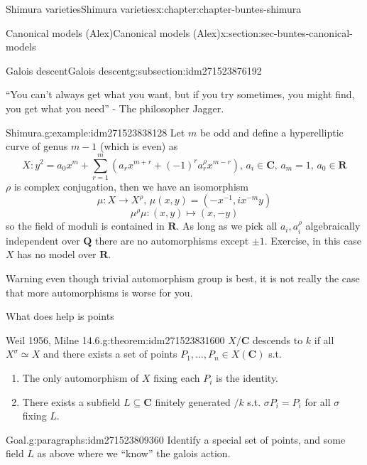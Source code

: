 \documentclass[oneside,10pt,]{book}
\numberwithin{equation}{section}
\newcommand{\inv}{^{-1}}
\newcommand{\QQ}{\mathbf{Q}}
\newcommand{\RR}{\mathbf{R}}
\newcommand{\CC}{\mathbf{C}}
\begin{document}
\begin{chapterptx}{Shimura varieties}{}{Shimura varieties}{}{}{x:chapter:chapter-buntes-shimura}
\begin{sectionptx}{Canonical models (Alex)}{}{Canonical models (Alex)}{}{}{x:section:sec-buntes-canonical-models}
\begin{subsectionptx}{Galois descent}{}{Galois descent}{}{}{g:subsection:idm271523876192}
\par
``You can't always get what you want, but if you try sometimes, you might find, you get what you need'' - The philosopher Jagger.%
\begin{example}{Shimura.}{g:example:idm271523838128}%
Let \(m\) be odd and define a hyperelliptic curve of genus \(m - 1\) (which is even) as%
\begin{equation*}
X\colon y^2 = a_0 x^m + \sum_{r= 1}^m (a_r x^{m+r} + (-1)^r a_r^\rho x^{m-r}),\,a_i \in \CC,\,a_m = 1,\,a_0 \in \RR
\end{equation*}
\(\rho\) is complex conjugation, then we have an isomorphism%
\begin{equation*}
\mu\colon X \to X^\rho,\,\mu(x,y) = (-x\inv, i x^{-m} y)
\end{equation*}
%
\begin{equation*}
\mu^\rho \mu \colon (x,y)\mapsto (x,-y)
\end{equation*}
so the field of moduli is contained in \(\RR\). As long as we pick all \(a_i,a_i^\rho\) algebraically independent over \(\QQ\) there are no automorphisms except \(\pm 1\). Exercise, in this case \(X\) has no model over \(\RR\).%
\end{example}
Warning even though trivial automorphism group is best, it is not really the case that more automorphisms is worse for you.%
\par
What does help is points%
\begin{theorem}{Weil 1956, Milne 14.6.}{}{g:theorem:idm271523831600}%
\(X/\CC\) descends to \(k\) if all \(X^\sigma \simeq X\) and there exists a set of points \(P_1,\ldots, P_n\in  X(\CC)\) s.t.%
\begin{enumerate}
\item{}The only automorphism of \(X\) fixing each \(P_i\) is the identity.%
\item{}There exists a subfield \(L \subseteq \CC\) finitely generated \(/k\) s.t. \(\sigma P_i = P_i\) for all \(\sigma\) fixing \(L\).%
\end{enumerate}
%
\end{theorem}
\begin{paragraphs}{Goal.}{g:paragraphs:idm271523809360}%
Identify a special set of points, and some field \(L\) as above where we ``know'' the galois action.%
\end{paragraphs}%
\end{subsectionptx}
%
%
\typeout{************************************************}
\typeout{************************************************}

\end{sectionptx}
\end{chapterptx}
\end{document}
